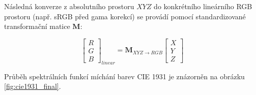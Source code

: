 \documentclass[FM,DP]{tulthesis}
\begin{document}
Následná konverze z absolutního prostoru $XYZ$ do konkrétního lineárního RGB
prostoru (např. sRGB před gama korekcí) se provádí pomocí standardizované
transformační matice $\mathbf{M}$:

\begin{equation}
    \begin{bmatrix} R \\ G \\ B \end{bmatrix}_{linear} = \mathbf{M}_{XYZ\to RGB} \begin{bmatrix} X \\ Y \\ Z \end{bmatrix}
\end{equation}

Průběh spektrálních funkcí míchání barev CIE 1931 je znázorněn na obrázku
\ref{fig:cie1931_final}.
\end{document}
